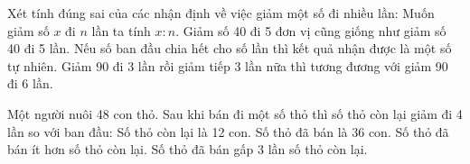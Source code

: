 \begin{ex} %
Xét tính đúng sai của các nhận định về việc giảm một số đi nhiều lần:
\choiceTF
{\True Muốn giảm số $x$ đi $n$ lần ta tính $x : n$.}
{Giảm số 40 đi 5 đơn vị cũng giống như giảm số 40 đi 5 lần.}
{\True Nếu số ban đầu chia hết cho số lần thì kết quả nhận được là một số tự nhiên.}
{Giảm 90 đi 3 lần rồi giảm tiếp 3 lần nữa thì tương đương với giảm 90 đi 6 lần.}
\end{ex}

\begin{ex} %
Một người nuôi 48 con thỏ. Sau khi bán đi một số thỏ thì số thỏ còn lại giảm đi 4 lần so với ban đầu:
\choiceTF
{\True Số thỏ còn lại là 12 con.}
{\True Số thỏ đã bán là 36 con.}
{Số thỏ đã bán ít hơn số thỏ còn lại.}
{\True Số thỏ đã bán gấp 3 lần số thỏ còn lại.}
\end{ex}

